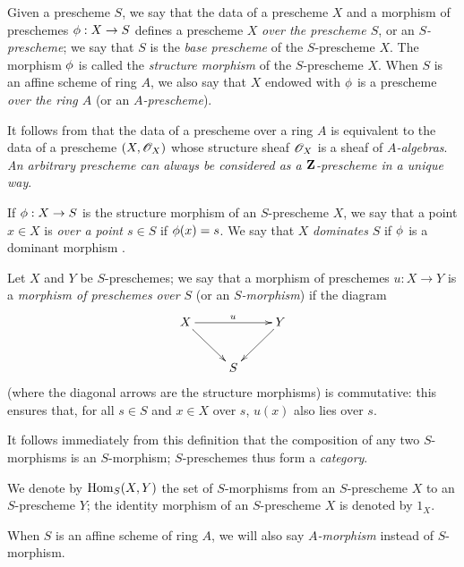 \begin{definition}[2.5.1]
\label{I.2.5.1}
Given a prescheme $S$, we say that the data of a prescheme $X$ and a morphism of preschemes $\vphi:X\to S$ defines a prescheme $X$ \emph{over the prescheme $S$}, or an \emph{$S$-prescheme};
we say that $S$ is the \emph{base prescheme} of the $S$-prescheme $X$.
The morphism $\phi$ is called the \emph{structure morphism} of the $S$-prescheme $X$.
When $S$ is an affine scheme of ring $A$, we also say that $X$ endowed with $\phi$ is a prescheme \emph{over the ring $A$} (or an \emph{$A$-prescheme}).
\end{definition}

It follows from  that the data of a prescheme over a ring $A$ is equivalent to the data of a prescheme $(X,\mathscr{O}_X)$ whose structure sheaf $\mathscr{O}_X$ is a sheaf of \emph{$A$-algebras}.
\emph{An arbitrary prescheme can always be considered as a $\mathbf{Z}$-prescheme in a unique way}.

If $\vphi:X\to S$ is the structure morphism of an $S$-prescheme $X$, we
say that a point $x\in X$ is \emph{over a point $s\in S$} if $\phi(x)=s$. We
say that $X$ \emph{dominates} $S$ if $\phi$ is a dominant morphism .

\begin{env}[2.5.2]
\label{I.2.5.2}
Let $X$ and $Y$ be $S$-preschemes;
we say that a morphism of preschemes $u:X\to Y$ is a \emph{morphism of preschemes over $S$} (or an \emph{$S$-morphism}) if the diagram
\[
  \xymatrix{
    X \ar[rr]^u \ar[dr] & & Y\ar[dl]\\
    & S &
  }
\]
(where the diagonal arrows are the structure morphisms) is commutative: this ensures that, for all $s\in S$ and $x\in X$ over $s$, $u(x)$ also lies over $s$.
\end{env}

It follows immediately from this definition that the composition of any two $S$-morphisms is an $S$-morphism;
$S$-preschemes thus form a \emph{category}.

We denote by $\operatorname{Hom}_S(X,Y)$ the set of $S$-morphisms from an $S$-prescheme $X$ to an $S$-prescheme $Y$;
the identity morphism of an $S$-prescheme $X$ is denoted by $1_X$.

When $S$ is an affine scheme of ring $A$, we will also say \emph{$A$-morphism} instead of $S$-morphism.

